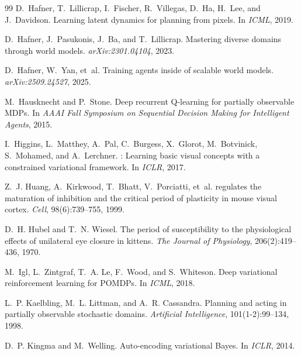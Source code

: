 \documentclass{article}
\begin{document}
\begin{thebibliography}{99}
D.~Hafner, T.~Lillicrap, I.~Fischer, R.~Villegas, D.~Ha, H.~Lee, and
  J.~Davidson.
\newblock Learning latent dynamics for planning from pixels.
\newblock In \emph{ICML}, 2019.

D.~Hafner, J.~Pasukonis, J.~Ba, and T.~Lillicrap.
\newblock Mastering diverse domains through world models.
\newblock \emph{arXiv:2301.04104}, 2023.

D.~Hafner, W.~Yan, et~al.
\newblock Training agents inside of scalable world models.
\newblock \emph{arXiv:2509.24527}, 2025.

M.~Hausknecht and P.~Stone.
\newblock Deep recurrent {Q}-learning for partially observable {MDPs}.
\newblock In \emph{AAAI Fall Symposium on Sequential Decision Making for
  Intelligent Agents}, 2015.

I.~Higgins, L.~Matthey, A.~Pal, C.~Burgess, X.~Glorot, M.~Botvinick,
  S.~Mohamed, and A.~Lerchner.
: Learning basic visual concepts with a constrained
  variational framework.
\newblock In \emph{ICLR}, 2017.

Z.~J. Huang, A.~Kirkwood, T.~Bhatt, V.~Porciatti, et~al.
 regulates the maturation of inhibition and the critical period
  of plasticity in mouse visual cortex.
\newblock \emph{Cell}, 98(6):739--755, 1999.

D.~H. Hubel and T.~N. Wiesel.
\newblock The period of susceptibility to the physiological effects of
  unilateral eye closure in kittens.
\newblock \emph{The Journal of Physiology}, 206(2):419--436, 1970.

M.~Igl, L.~Zintgraf, T.~A. Le, F.~Wood, and S.~Whiteson.
\newblock Deep variational reinforcement learning for {POMDPs}.
\newblock In \emph{ICML}, 2018.

L.~P. Kaelbling, M.~L. Littman, and A.~R. Cassandra.
\newblock Planning and acting in partially observable stochastic domains.
\newblock \emph{Artificial Intelligence}, 101(1-2):99--134, 1998.

D.~P. Kingma and M.~Welling.
\newblock Auto-encoding variational {Bayes}.
\newblock In \emph{ICLR}, 2014.


\end{thebibliography}
\end{document}
